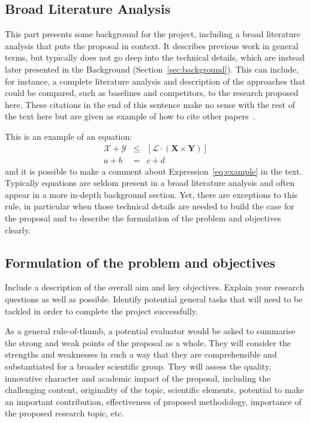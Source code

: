 \documentclass{article}
\newcommand{\cX}{\mathcal{X}}
\newcommand{\cL}{\mathcal{L}}
\newcommand{\cY}{\mathcal{Y}}
\newcommand{\bX}{\mathbf{X}}
\newcommand{\bY}{\mathbf{Y}}
\begin{document}
\subsection{Broad Literature Analysis}\label{sec:broadliterature}

This part presents some background for the project, including a broad literature analysis that puts the proposal in context. It describes previous work in general terms, but typically does not go deep into the technical details, which are instead later presented in the Background (Section~\ref{sec:background}). This can include, for instance, a complete literature analysis and description of the approaches that could be compared, such as baselines and competitors, to the research proposed here. These citations in the end of this sentence make no sense with the rest of the text here but are given as example of how to cite other papers~\citep{al2019predicting,alotaibi2020applications}.

This is an example of an equation:
\begin{eqnarray}
  \label{eq:example}
  \cX + \cY & \leq & \left[ \cL \cdot (\bX \times \bY) \right]\\
  a + b & = & c + d \nonumber
\end{eqnarray}
\noindent
and it is possible to make a comment about Expression~\eqref{eq:example} in the text. Typically equations are seldom present in a broad literature analysis and often appear in a more in-depth background section. Yet, there are exceptions to this rule, in particular when those technical details are needed to build the case for the proposal and to describe the formulation of the problem and objectives clearly.

\subsection{Formulation of the problem and objectives}

Include a description of the overall aim and key objectives. Explain your research questions as well as possible. Identify potential general tasks that will need to be tackled in order to complete the project successfully.

As a general rule-of-thumb, a potential evaluator would be asked to summarise the strong and weak points of the proposal as a whole. They will consider the strengths and weaknesses in such a way that they are comprehensible and substantiated for a broader scientific group. They will assess the quality, innovative character and academic impact of the proposal, including the challenging content, originality of the topic, scientific elements, potential to make an important contribution, effectiveness of proposed methodology, importance of the proposed research topic, etc.
\end{document}
